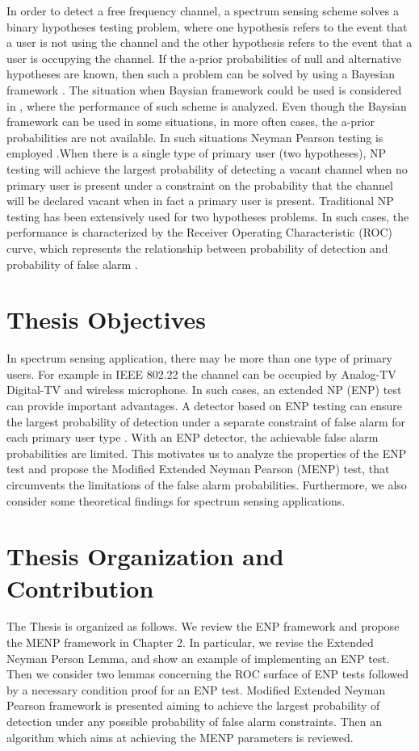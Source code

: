 In order to detect a free frequency channel, a spectrum sensing scheme solves a binary hypotheses testing problem, where one hypothesis refers to the event that a user is not using the channel and the other hypothesis refers to the event that a user is occupying the channel. If the a-prior probabilities of null and alternative hypotheses are known, then such a problem can be solved by using a Bayesian framework \cite{poor1994introduction}. The situation when Baysian framework could be used is considered in \cite{zeng2010review}, where  the performance of such scheme is analyzed.
Even though the Baysian framework can be used in some situations, in more often cases, the a-prior probabilities are not available. In such situations Neyman Pearson testing is employed \cite{poor1994introduction}.When there is a single type of primary user (two hypotheses), NP testing will achieve the largest probability of detecting a vacant channel when no primary user is present under a constraint on the probability that the channel will be declared vacant when in fact a primary user is present.
Traditional NP testing has been extensively used for two hypotheses problems. In such cases,  the performance is characterized by the Receiver Operating Characteristic (ROC) curve, which represents the relationship between probability of detection and probability of false alarm \cite{poor1994introduction}. 

\section{Thesis Objectives}
In spectrum sensing application, there may be more than one type of primary users. For example in IEEE 802.22  the channel can be occupied by Analog-TV Digital-TV and wireless microphone\cite{shellhammer2008spectrum}. 
In such cases, an extended NP (ENP) test  \cite{LehmannTest} can provide important advantages. A detector based on ENP testing can ensure the largest probability of detection under a separate constraint of false alarm for each primary user type \cite{LehmannTest}.
With an ENP detector, the achievable false alarm probabilities are limited. This motivates us to analyze the properties of the ENP test and propose the Modified Extended Neyman Pearson (MENP) test, that circumvents the limitations of the false alarm probabilities. Furthermore, we also consider some theoretical  findings for spectrum sensing applications.  

\section{Thesis Organization and Contribution}
The Thesis is organized as follows. We review the ENP framework and propose the MENP framework in Chapter 2. In particular, we revise the  Extended Neyman Person Lemma, and show an example of implementing an ENP test. Then we consider two lemmas concerning the ROC surface of ENP tests followed by  a necessary condition proof for an  ENP test. 
Modified Extended Neyman Pearson framework is presented aiming to achieve the largest probability of detection  under any possible probability of false alarm constraints. Then an algorithm which aims at achieving the MENP parameters is reviewed.  

